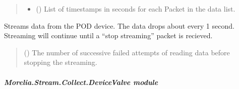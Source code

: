 \documentclass[letterpaper,10pt,english]{sphinxmanual}
\begin{document}
\begin{fulllineitems}
\begin{fulllineitems}
\begin{quote}
\begin{description}
\begin{itemize}
\item {} 
\sphinxAtStartPar
{} (\sphinxstyleliteralemphasis{\sphinxupquote{{[}}}\sphinxstyleliteralemphasis{\sphinxupquote{{]}}}) \textendash{} List of timestamps in seconds for each Packet                 in the data list.

\end{itemize}

\end{description}\end{quote}

\end{fulllineitems}


\begin{fulllineitems}
\label{\detokenize{Morelia.Stream.Collect:Morelia.Stream.Collect.DataHose.Hose._Flow}}
\pysigstartsignatures
{}
\pysigstopsignatures
\sphinxAtStartPar
Streams data from the POD device. The data drops about every 1 second.         Streaming will continue until a “stop streaming” packet is recieved.
\begin{quote}\begin{description}
\sphinxAtStartPar
{} () \textendash{} The number of successive failed attempts of reading data before stopping the streaming.

\end{description}\end{quote}

\end{fulllineitems}


\end{fulllineitems}



\subparagraph{Morelia.Stream.Collect.DeviceValve module}
\label{\detokenize{Morelia.Stream.Collect:module-Morelia.Stream.Collect.DeviceValve}}\label{\detokenize{Morelia.Stream.Collect:morelia-stream-collect-devicevalve-module}}
\end{document}
